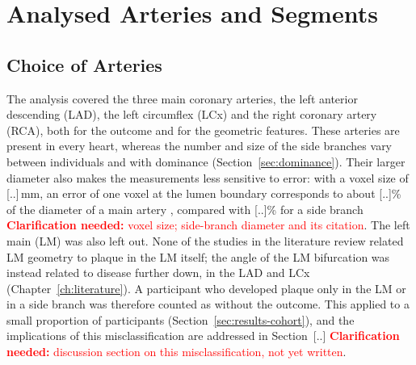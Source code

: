 \providecommand{\clarify}[1]{\textcolor{red}{\textbf{Clarification needed:} #1}}
\section{Analysed Arteries and Segments}

\subsection{Choice of Arteries}
\label{sec:method-population-arteries}

The analysis covered the three main coronary arteries, the left anterior descending (LAD), the left circumflex (LCx) and the right coronary artery (RCA), both for the outcome and for the geometric features.
These arteries are present in every heart, whereas the number and size of the side branches vary between individuals and with dominance (Section~\ref{sec:dominance}).
Their larger diameter also makes the measurements less sensitive to error: with a voxel size of [..]\,mm, an error of one voxel at the lumen boundary corresponds to about [..]\% of the diameter of a main artery \cite{dodge1992diameter}, compared with [..]\% for a side branch \clarify{voxel size; side-branch diameter and its citation}.
The left main (LM) was also left out.
None of the studies in the literature review related LM geometry to plaque in the LM itself; the angle of the LM bifurcation was instead related to disease further down, in the LAD and LCx (Chapter~\ref{ch:literature}).
A participant who developed plaque only in the LM or in a side branch was therefore counted as without the outcome.
This applied to a small proportion of participants (Section~\ref{sec:results-cohort}), and the implications of this misclassification are addressed in Section~[..] \clarify{discussion section on this misclassification, not yet written}.                                                                           

